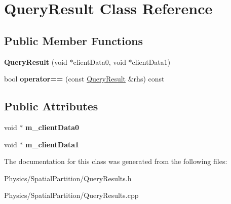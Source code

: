 \hypertarget{classQueryResult}{}\section{Query\+Result Class Reference}
\label{classQueryResult}
\subsection*{Public Member Functions}
\begin{DoxyCompactItemize}
\item 
\mbox{\label{classQueryResult_a8a8e372f20aede57dd8ea5f6d8c7e21b}} 
{\bfseries Query\+Result} (void $\ast$client\+Data0, void $\ast$client\+Data1)
\item 
\mbox{\label{classQueryResult_ae0b1f5779416deb42a3e479e410813ea}} 
bool {\bfseries operator==} (const \hyperlink{classQueryResult}{Query\+Result} \&rhs) const
\end{DoxyCompactItemize}
\subsection*{Public Attributes}
\begin{DoxyCompactItemize}
\item 
\mbox{\label{classQueryResult_abb436a572b68e508716e3718459c06dc}} 
void $\ast$ {\bfseries m\+\_\+client\+Data0}
\item 
\mbox{\label{classQueryResult_a172c2a316ecf890b390c27af9c8438ad}} 
void $\ast$ {\bfseries m\+\_\+client\+Data1}
\end{DoxyCompactItemize}


The documentation for this class was generated from the following files\+:\begin{DoxyCompactItemize}
\item 
Physics/\+Spatial\+Partition/Query\+Results.\+h\item 
Physics/\+Spatial\+Partition/Query\+Results.\+cpp\end{DoxyCompactItemize}
